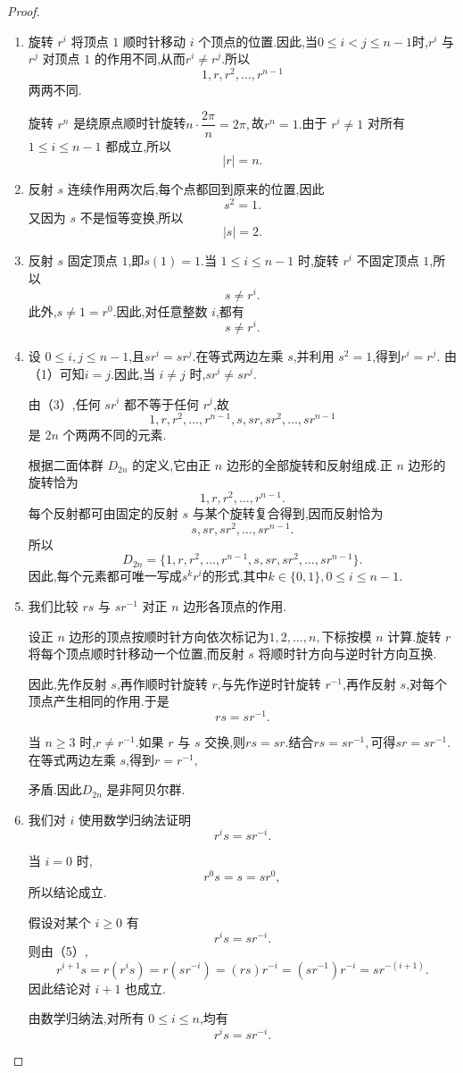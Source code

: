 \begin{proof}
	\begin{enumerate}[label=(\arabic*)]
		\item 旋转 $r^i$ 将顶点 $1$ 顺时针移动 $i$ 个顶点的位置.因此,当$0\leq i<j\leq n-1$时,$r^i$ 与 $r^j$ 对顶点 $1$ 的作用不同,从而$r^i\neq r^j.$所以
		\[
		1,r,r^2,\ldots,r^{n-1}
		\]
		两两不同.
		
		旋转 $r^n$ 是绕原点顺时针旋转$n\cdot\dfrac{2\pi}{n}=2\pi,$故$r^n=1.$由于 $r^i\neq 1$ 对所有 $1\leq i\leq n-1$ 都成立,所以
		\[
		|r|=n.
		\]
		
		\item 反射 $s$ 连续作用两次后,每个点都回到原来的位置,因此
		\[
		s^2=1.
		\]
		又因为 $s$ 不是恒等变换,所以
		\[
		|s|=2.
		\]
		
		\item 反射 $s$ 固定顶点 $1$,即$s(1)=1.$当 $1\leq i\leq n-1$ 时,旋转 $r^i$ 不固定顶点 $1$,所以
		\[
		s\neq r^i.
		\]
		此外,$s\neq 1=r^0$.因此,对任意整数 $i$,都有
		\[
		s\neq r^i.
		\]
		
		\item 设 $0\leq i,j\leq n-1$,且$sr^i=sr^j.$在等式两边左乘 $s$,并利用 $s^2=1$,得到$r^i=r^j.$
		由（1）可知$i=j.$因此,当 $i\neq j$ 时,$sr^i\neq sr^j.$
	
		由（3）,任何 $sr^i$ 都不等于任何 $r^j$,故
		\[
		1,r,r^2,\ldots,r^{n-1},
		s,sr,sr^2,\ldots,sr^{n-1}
		\]
		是 $2n$ 个两两不同的元素.
		
		根据二面体群 $D_{2n}$ 的定义,它由正 $n$ 边形的全部旋转和反射组成.正 $n$ 边形的旋转恰为
		\[
		1,r,r^2,\ldots,r^{n-1}.
		\]
		每个反射都可由固定的反射 $s$ 与某个旋转复合得到,因而反射恰为
		\[
		s,sr,sr^2,\ldots,sr^{n-1}.
		\]
		所以
		\[
		D_{2n}
		=
		\{1,r,r^2,\ldots,r^{n-1},
		s,sr,sr^2,\ldots,sr^{n-1}\}.
		\]
		因此,每个元素都可唯一写成$s^kr^i$的形式,其中$k\in\{0,1\},0\leq i\leq n-1.$
		 \item 我们比较 $rs$ 与 $sr^{-1}$ 对正 $n$ 边形各顶点的作用.
		
		设正 $n$ 边形的顶点按顺时针方向依次标记为$1,2,\ldots,n,$下标按模 $n$ 计算.旋转 $r$ 将每个顶点顺时针移动一个位置,而反射 $s$ 将顺时针方向与逆时针方向互换.
		
		因此,先作反射 $s$,再作顺时针旋转 $r$,与先作逆时针旋转 $r^{-1}$,再作反射 $s$,对每个顶点产生相同的作用.于是
		\[
		rs=sr^{-1}.
		\]
		
		当 $n\geq 3$ 时,$r\neq r^{-1}$.如果 $r$ 与 $s$ 交换,则$rs=sr.$结合$rs=sr^{-1},$可得$sr=sr^{-1}.$在等式两边左乘 $s$,得到$r=r^{-1},$
		
		矛盾.因此$D_{2n}$ 是非阿贝尔群.
		
		\item 我们对 $i$ 使用数学归纳法证明
		\[
		r^is=sr^{-i}.
		\]
		
		当 $i=0$ 时,
		\[
		r^0s=s=sr^0,
		\]
		所以结论成立.
		
		假设对某个 $i\geq 0$ 有
		\[
		r^is=sr^{-i}.
		\]
		则由（5）,
		\[r^{i+1}s=r(r^is)
			=r(sr^{-i})
			=(rs)r^{-i}
			=(sr^{-1})r^{-i}
			=sr^{-(i+1)}.\]
		因此结论对 $i+1$ 也成立.
		
		由数学归纳法,对所有 $0\leq i\leq n$,均有
		\[
		r^is=sr^{-i}.
		\]
	\end{enumerate}
\end{proof}
